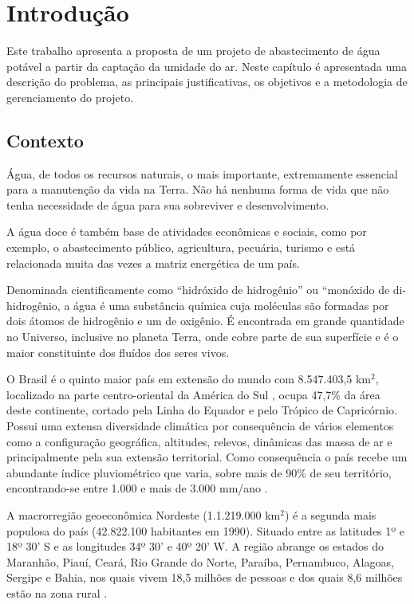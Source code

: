 \chapter[Introdução]{Introdução}

Este trabalho apresenta a proposta de um projeto de abastecimento de água potável a partir da captação da umidade do ar.
Neste capítulo é apresentada uma descrição do problema, as principais justificativas,
os objetivos e a metodologia de gerenciamento do projeto. 

\section{Contexto}

Água, de todos os recursos naturais, o mais importante, extremamente essencial para a manutenção da vida na Terra.
Não há nenhuma forma de vida que não tenha necessidade de água para sua sobreviver e desenvolvimento. 

A água doce é também base de atividades econômicas e sociais, como por exemplo, o abastecimento público, agricultura,
pecuária, turismo e está relacionada muita das vezes a matriz energética de um país. 

Denominada cientificamente como “hidróxido de hidrogênio” ou “monóxido de di-hidrogênio, a água é uma substância química
cuja moléculas são formadas por dois átomos de hidrogênio e um de oxigênio. É encontrada em grande quantidade no Universo,
inclusive no planeta Terra, onde cobre parte de sua superfície e é o maior constituinte dos fluídos dos seres vivos. 

O Brasil é o quinto maior país em extensão do mundo com 8.547.403,5 km$^2$,
localizado na parte centro-oriental da América do Sul , ocupa 47,7\%  da área deste continente, cortado pela Linha do Equador
e pelo Trópico de Capricórnio. Possui uma extensa diversidade climática por consequência de vários elementos como a configuração
geográfica, altitudes, relevos, dinâmicas das massa de ar e principalmente pela sua extensão territorial. 
Como consequência o país recebe um abundante índice pluviométrico que varia, sobre mais de 90\% de seu território,
encontrando-se entre 1.000 e mais de 3.000 mm/ano \cite{reboucas03}.

A macrorregião geoeconômica Nordeste (1.1.219.000 km$^2$) é a segunda mais populosa do país (42.822.100 habitantes em 1990). 
Situado entre 	as latitudes 1º e 18º 30’ S e as longitudes 34º 30’ e 40º 20’ W.
A região abrange os estados do Maranhão, Piauí, Ceará, Rio Grande do Norte, Paraíba, Pernambuco, Alagoas, Sergipe e Bahia, nos
quais vivem 18,5 milhões de pessoas e dos quais 8,6 milhões estão na zona rural \cite{cirilo}.

